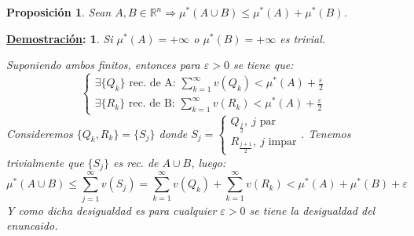 \documentclass[10pt,a4paper,openright]{book}
\theoremstyle{break}
\newtheorem*{prop}{Proposición}
\newtheorem*{demo}{\underline{Demostración}:}
\begin{document}
\begin{prop}
Sean $A, B \in \mathbb{R}^{n} \Rightarrow \mu^{*}\left( A \cup B \right) \le \mu^{*}\left( A \right) + \mu^{*}\left( B \right)$.
\end{prop}
\begin{demo}
Si $\mu^{*}\left( A \right) = +\infty$ o $\mu^{*}\left( B \right) = +\infty$ es trivial. 
 
Suponiendo ambos finitos, entonces para $\varepsilon > 0$ se tiene que:
$$\begin{cases}
\exists \{Q_k\} \text{ rec. de A: } \sum_{k=1}^{\infty} v\left( Q_k \right) < \mu^{*}\left( A \right) + \frac{\varepsilon}{2}  \\
\exists \{R_k\} \text{ rec. de B: } \sum_{k=1}^{\infty} v\left( R_k \right) < \mu^{*}\left( A \right) + \frac{\varepsilon}{2} 
\end{cases}
$$
Consideremos $ \{Q_k, R_k\} = \{S_j\}$ donde $S_j = \begin{cases}
Q_{\frac{j}{2}},\ j \text{ par} \\
R_{\frac{j+1}{2}},\ j \text{ impar} 
\end{cases}$. Tenemos trivialmente que $\{S_j\}$ es rec. de $A\cup B$, luego:
$$\mu^{*}\left( A\cup B \right) \le \sum_{j=1}^{\infty} v\left( S_j \right) = \sum_{k=1}^{\infty} v\left( Q_k \right) + \sum_{k=1}^{\infty} v\left( R_k \right) < \mu^{*}\left( A \right) + \mu^{*}\left( B \right) + \varepsilon$$
Y como dicha desigualdad es para cualquier $\varepsilon > 0$ se tiene la desigualdad del enuncaido.
\end{demo}
\end{document}
